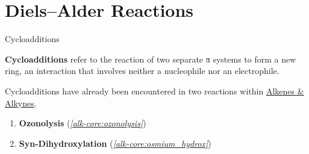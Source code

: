 
\section{Diels--Alder Reactions} %

  \begin{core}{Cycloadditions}

    \textbf{Cycloadditions} refer to the reaction of two separate π systems to form a new ring, an interaction that involves neither a nucleophile nor an electrophile.

    Cycloadditions have already been encountered in two reactions within \href{https://ibahng.github.io/chemistry/alkene_alkyne/alkene_alkyne.pdf}{Alkenes \& Alkynes}.

    \begin{enumerate}

      \item \textbf{Ozonolysis} (\textit{\autoref{alk-core:ozonolysis}})

      \vspace{-0.4cm}

      \item \textbf{ Syn-Dihydroxylation} (\textit{\autoref{alk-core:osmium_hydrox}})


\end{enumerate}
\end{core}
